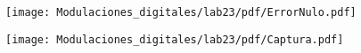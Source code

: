 
\begin{frame}
\begin{figure}[H]
\vspace{-3mm}
\centering
\texttt{[image: Modulaciones\_digitales/lab23/pdf/ErrorNulo.pdf]}
\end{figure}
\end{frame}


\begin{frame}
\begin{figure}[H]
\vspace{-3mm}
\centering
\texttt{[image: Modulaciones\_digitales/lab23/pdf/Captura.pdf]}
\end{figure}
\end{frame}

